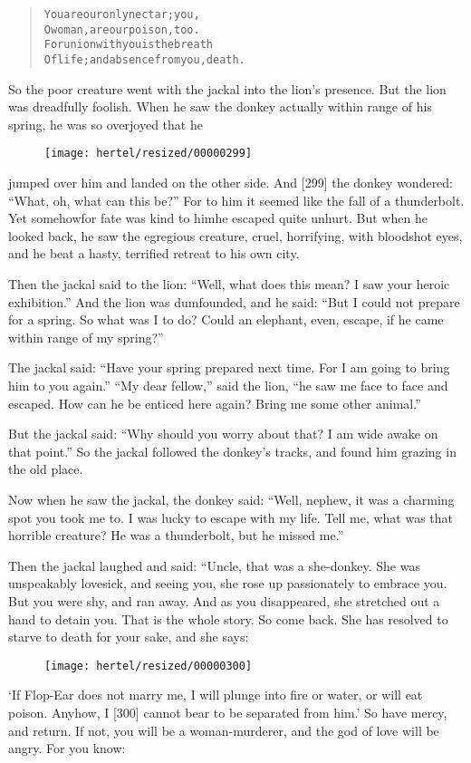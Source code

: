\documentclass[article, twoside, 10pt]{memoir}
\renewenvironment{verbatim}{%
\begin{quote}%
\vskip -10pt%
\begin{alltt}\normalfont\small}{\end{alltt}%
\end{quote}%
\vskip -10pt
} %
\begin{document}
\begin{verbatim}
You are our only nectar; you,
O woman, are our poison, too.
For union with you is the breath
Of life; and absence from you, death.
\end{verbatim}
So the poor creature went with the jackal into the lion's presence.
But the lion was dreadfully foolish. When he saw the donkey
actually within range of his spring, he was so overjoyed that he
\begin{figure}[p]\texttt{[image: hertel/resized/00000299]}\end{figure}jumped over him and landed on the other side. And [299] the donkey
wondered: ``What, oh, what can this be?'' For to him it seemed like
the fall of a thunderbolt. Yet somehow{\textemdash}for fate was kind to
him{\textemdash}he escaped quite unhurt. But when he looked back, he saw the
egregious creature, cruel, horrifying, with bloodshot eyes, and he
beat a hasty, terrified retreat to his own city.

Then the jackal said to the lion:
``Well, what does this mean? I saw your heroic exhibition.'' And
the lion was dumfounded, and he said:
``But I could not prepare for a spring. So what was I to do? Could an elephant, even, escape, if he came within range of my spring?''

The jackal said:
``Have your spring prepared next time. For I am going to bring him to you again.''
``My dear fellow,'' said the lion,
``he saw me face to face and escaped. How can he be enticed here again? Bring me some other animal.''

But the jackal said:
``Why should you worry about that? I am wide awake on that point.''
So the jackal followed the donkey's tracks, and found him grazing
in the old place.

Now when he saw the jackal, the donkey said:
``Well, nephew, it was a charming spot you took me to. I was lucky to escape with my life. Tell me, what was that horrible creature? He was a thunderbolt, but he missed me.''

Then the jackal laughed and said: “Uncle, that was a she-donkey.
She was unspeakably lovesick, and seeing you, she rose up
passionately to embrace you. But you were shy, and ran away. And as
you disappeared, she stretched out a hand to detain you. That is
the whole story. So come back. She has resolved to starve to death
for your sake, and she says:
\begin{figure}[p]\texttt{[image: hertel/resized/00000300]}\end{figure}`If Flop-Ear does not marry me, I will plunge into fire or water, or will eat poison. Anyhow, I [300] cannot bear to be separated from him.'
So have mercy, and return. If not, you will be a woman-murderer,
and the god of love will be angry. For you know:
\end{document}
